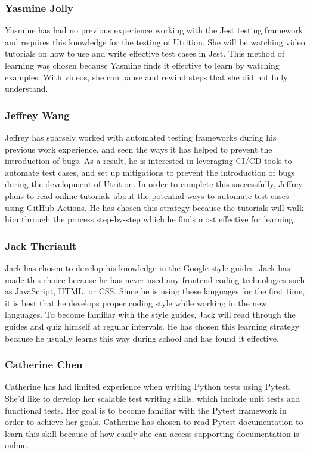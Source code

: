 \documentclass[12pt, titlepage]{article}
\begin{document}
	\subsubsection*{Yasmine Jolly}
	Yasmine has had no previous experience working with the Jest testing framework and requires this knowledge for the testing of Utrition. She will be watching video tutorials on how to use and write effective test cases in Jest. This method of learning was chosen because Yasmine finds it effective to learn by watching examples. With videos, she can pause and rewind steps that she did not fully understand.
	
	\subsubsection*{Jeffrey Wang}
	
	Jeffrey has sparsely worked with automated testing frameworks during his 
	previous work experience, and seen the ways it has helped to prevent the 
	introduction of bugs. As a result, he is interested in leveraging CI/CD 
	tools to automate test cases, and set up mitigations to prevent the 
	introduction of bugs during the development of Utrition. In order to 
	complete this successfully, Jeffrey plans to read online tutorials about 
	the potential ways to automate test cases using GitHub Actions. He has chosen this strategy because the tutorials will walk him through the process step-by-step which he finds most effective for learning.
	
	\subsubsection*{Jack Theriault}
	Jack has chosen to develop his knowledge in the Google style guides. Jack has made this choice because he has never used any frontend coding technologies such as JavaScript, HTML, or CSS. Since he is using these languages for the first time, it is best that he develops proper coding style while working in the new languages. To become familiar with the style guides, Jack will read through the guides and quiz himself at regular intervals. He has chosen this learning strategy because he usually learns this way during school and has found it effective.
	
	\subsubsection*{Catherine Chen}
	
	Catherine has had limited experience when writing Python tests using Pytest. She'd like to develop her scalable test writing skills, which include unit tests and functional tests. Her goal is to become familiar with the Pytest framework in order to achieve her goals. Catherine has chosen to read Pytest documentation to learn this skill because of how easily she can access supporting documentation is online.
	
\end{document}
